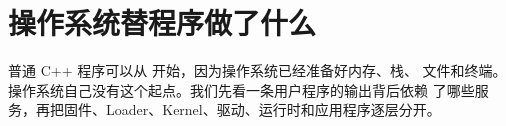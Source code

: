 \chapter{操作系统替程序做了什么}

普通 C++ 程序可以从  开始，因为操作系统已经准备好内存、栈、
文件和终端。操作系统自己没有这个起点。我们先看一条用户程序的输出背后依赖
了哪些服务，再把固件、Loader、Kernel、驱动、运行时和应用程序逐层分开。




